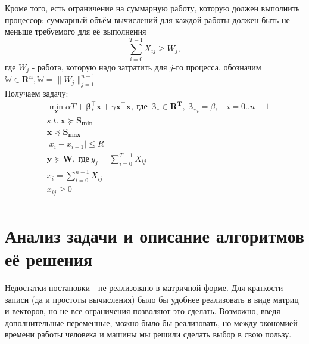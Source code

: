 \documentclass{article}
\begin{document}
Кроме того, есть ограничение на суммарную работу, которую должен выполнить процессор: суммарный объём вычислений для каждой работы должен быть не меньше требуемого для её выполнения\\
$$\sum \limits_{i=0}^{T-1} X_{ij} \ge W_j,$$ где $W_j$ - работа, которую надо затратить для $j$-го процесса, обозначим $\mathbb{W} \in \mathbf{R^n}, \mathbb{W} = \| W_j \|_{j=1}^{n-1}$\\


Получаем задачу:\\
\begin{equation}
\begin{split}
& \min\limits_{\textbf{x}} \alpha T + \mathbf{\pmb{\beta_{*}^{\top}}x} + \gamma \mathbf{x^{\top}x},~ \text{где}~ \ \pmb{\beta_*} \in \mathbf{R^T}, \  \pmb{\beta_*}_i = \beta, \quad  i = 0..n-1 \\
& s.t. ~\mathbf{x} \succeq \mathbf{S_{min}}\\ 
& \mathbf{x} \preceq \mathbf{S_{max}} \\
& |x_{i} - x_{i-1}| \le R \\
&\mathbf{y} \succeq \mathbf{W},~ \text{где}~ y_j = \sum\limits_{i=0}^{T-1} X_{ij} \\
& x_i = \sum \limits_{i=0}^{n-1} X_{ij} \\
& x_{ij} \geq 0\\
\end{split}
\end{equation}


\section{Анализ задачи и описание алгоритмов её решения}

Недостатки постановки - не реализовано в матричной форме. Для краткости записи (да и простоты вычисления) было бы удобнее реализовать в виде матриц и векторов, но не все ограничения позволяют это сделать. Возможно, введя дополнительные переменные, можно было бы реализовать, но между экономией времени работы человека и машины мы решили сделать выбор в свою пользу.\\
\end{document}
